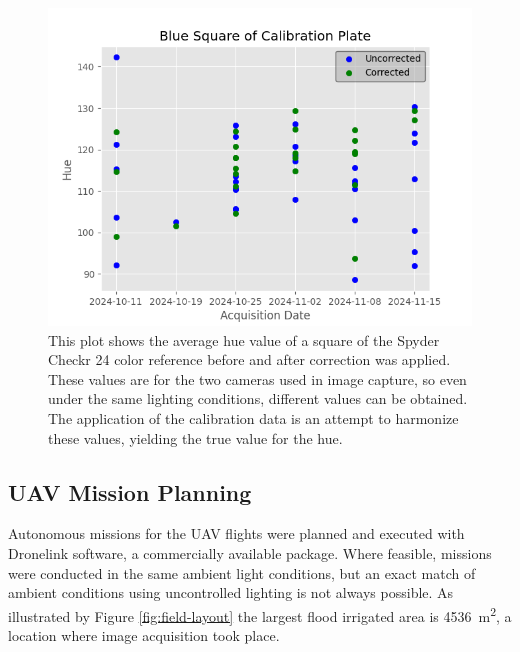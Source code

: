 \documentclass[letterpaper, notitlepage]{report}
\begin{document}
\begin{figure}[!htb]
	\centering
	\includegraphics[width=0.7\linewidth]{./figures/plot-calibration.png}
	\caption[Color correction over a portion of a growth cycle]{This plot shows the average hue value of a square of the Spyder Checkr 24 color reference before and after correction was applied. These values are for the two cameras used in image capture, so even under the same lighting conditions, different values can be obtained. The application of the calibration data is an attempt to harmonize these values, yielding the true value for the hue.}
	\label{fig:calibration-plot}
\end{figure}

\subsection{\gls{UAV} Mission Planning}
Autonomous missions for the  \gls{UAV} flights were planned and executed with Dronelink software, a commercially available package.  Where feasible, missions were conducted in the same ambient light conditions, but an exact match of ambient conditions using uncontrolled lighting is not always possible.
As illustrated by Figure \ref{fig:field-layout} the largest flood irrigated area is \SI{4536}{\metre\squared}, a location where image acquisition took place.  
\end{document}
